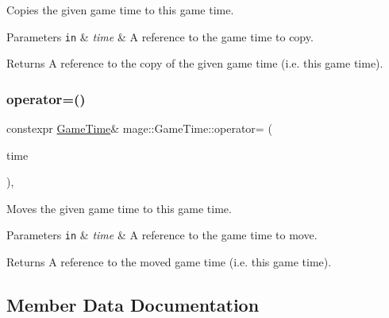 Copies the given game time to this game time.


\begin{DoxyParams}[1]{Parameters}
\mbox{\tt in}  & {\em time} & A reference to the game time to copy. \\
\hline
\end{DoxyParams}
\begin{DoxyReturn}{Returns}
A reference to the copy of the given game time (i.\+e. this game time). 
\end{DoxyReturn}
\mbox{\label{classmage_1_1_game_time_a79756019f21b5125114483ddc71247fe}} 
\subsubsection{\texorpdfstring{operator=()}{operator=()}\hspace{0.1cm}{\footnotesize\ttfamily [2/2]}}
{\footnotesize\ttfamily constexpr \mbox{\hyperlink{classmage_1_1_game_time}{Game\+Time}}\& mage\+::\+Game\+Time\+::operator= (\begin{DoxyParamCaption}\item[{\mbox{\hyperlink{classmage_1_1_game_time}{Game\+Time}} \&\&}]{time }\end{DoxyParamCaption})\hspace{0.3cm}{\ttfamily [default]}, {\ttfamily [noexcept]}}

Moves the given game time to this game time.


\begin{DoxyParams}[1]{Parameters}
\mbox{\tt in}  & {\em time} & A reference to the game time to move. \\
\hline
\end{DoxyParams}
\begin{DoxyReturn}{Returns}
A reference to the moved game time (i.\+e. this game time). 
\end{DoxyReturn}


\subsection{Member Data Documentation}
\mbox{\label{classmage_1_1_game_time_abe875fff075fa87e4d029221f84b9f35}} 
